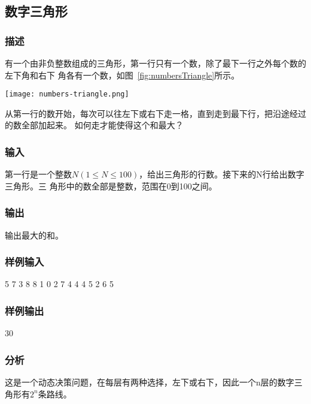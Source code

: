 \subsection{数字三角形}

\subsubsection{描述}
有一个由非负整数组成的三角形，第一行只有一个数，除了最下一行之外每个数的左下角和右下
角各有一个数，如图~\ref{fig:numbersTriangle}所示。

\begin{center}
\texttt{[image: numbers-triangle.png]}\\
\label{fig:numbersTriangle}
\end{center}

从第一行的数开始，每次可以往左下或右下走一格，直到走到最下行，把沿途经过的数全部加起来。
如何走才能使得这个和最大？

\subsubsection{输入}
第一行是一个整数$N (1 \le N \leq 100)$，给出三角形的行数。接下来的N行给出数字三角形。三
角形中的数全部是整数，范围在0到100之间。

\subsubsection{输出}
输出最大的和。

\subsubsection{样例输入}
\begin{Code}
5
7
3 8 
8 1 0  
2 7 4 4 
4 5 2 6 5
\end{Code}

\subsubsection{样例输出}
\begin{Code}
30
\end{Code}

\subsubsection{分析}
这是一个动态决策问题，在每层有两种选择，左下或右下，因此一个n层的数字三角形有$2^n$条路线。


